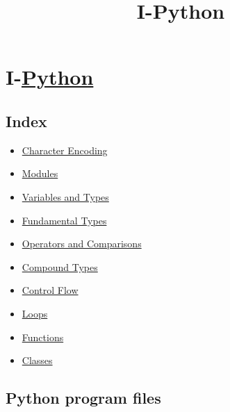 \documentclass{article}
\title{I-Python}
\begin{document}
    
    
    \maketitle
    
    

    
    

    \section{I-\href{https://www.python.org/}{Python}}\label{i-python}


    \subsection{Index}


    \begin{itemize}
\itemsep1pt\parskip0pt
\item
  \hyperref[characterux5fencoding]{Character Encoding}
\item
  \hyperref[modules]{Modules}
\item
  \hyperref[variablesux5fandux5ftypes]{Variables and Types}
\item
  \hyperref[fundamentalux5ftypes]{Fundamental Types}
\item
  \hyperref[operatorsux5fandux5fcomparisons]{Operators and Comparisons}
\item
  \hyperref[compoundux5ftypes]{Compound Types}
\item
  \hyperref[controlux5fflow]{Control Flow}
\item
  \hyperref[loops]{Loops}
\item
  \hyperref[functions]{Functions}
\item
  \hyperref[classes]{Classes}
\end{itemize}

    \subsection{Python program files}\label{python-program-files}
\end{document}
